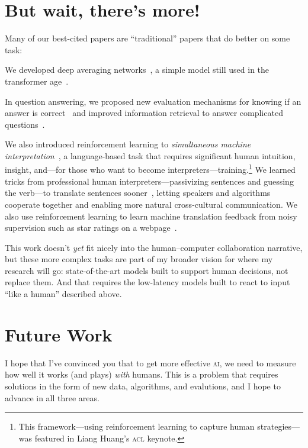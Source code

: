 \documentclass[11pt]{amsart}
\newcommand{\abr}[1]{\textsc{#1}}
\begin{document}
\section{But wait, there's more!}

Many of our best-cited papers are ``traditional'' papers that do
better on some task:
%
\begin{itemize*}
\item We developed deep averaging networks~\cite[\abr{dan}]{iyyer-15}, a simple model still used in the 
transformer age~\cite{ye-22}.

\item In question answering, we proposed new evaluation mechanisms
  for knowing if an answer is correct~\cite{si-21} and improved
  information retrieval to answer complicated
  questions~\cite{elgohary-19,zhao-20,shi-20}.
  
\item We also introduced reinforcement learning to \emph{simultaneous
machine interpretation}~\cite{Grissom:He:Boyd-Graber:Morgan-2014}, a
  language-based task that requires significant human intuition,
  insight, and---for those who want to become
  interpreters---training.\footnote{This framework---using
  reinforcement learning to capture human strategies---was featured in
  Liang Huang's \abr{acl} keynote.} We learned tricks from
  professional human interpreters---passivizing sentences and guessing
  the verb---to translate sentences sooner~\cite{He-15}, letting
  speakers and algorithms cooperate together and enabling more natural
  cross-cultural communication.  We also use reinforcement
  learning to learn machine translation feedback from noisy
  supervision such as star ratings on a webpage~\cite{nguyen-17}.
\end{itemize*}

This work doesn't \emph{yet} fit nicely into the human--computer
collaboration narrative, but these more complex tasks are part of my
broader vision for where my research will go: state-of-the-art models
built to support human decisions, not replace them.  And that requires
the low-latency models built to react to input ``like a human''
described above.

\section{Future Work}

I hope that I've convinced you that to get more effective \abr{ai}, we
need to measure how well it works (and plays) \emph{with} humans.
%
This is a problem that requires solutions in the form of new data, algorithms, and evalutions, and I
hope to advance in all three areas.
\end{document}
